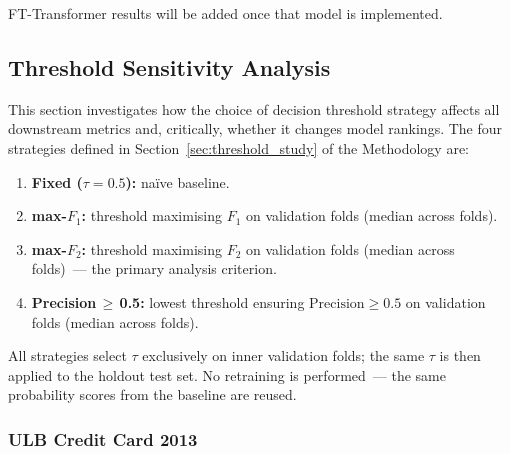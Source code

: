 FT-Transformer results will be added once that model is implemented.



\subsection{Threshold Sensitivity Analysis}
\label{sec:threshold_sensitivity}

This section investigates how the choice of decision threshold strategy
affects all downstream metrics and, critically, whether it changes model rankings.
The four strategies defined in Section~\ref{sec:threshold_study} of the Methodology are:
\begin{enumerate}
  \item \textbf{Fixed ($\tau=0.5$):} na\"ive baseline.
  \item \textbf{max-$F_1$:} threshold maximising $F_1$ on validation folds (median across folds).
  \item \textbf{max-$F_2$:} threshold maximising $F_2$ on validation folds (median across folds)~--- the primary analysis criterion.
  \item \textbf{Precision\,$\geq$\,0.5:} lowest threshold ensuring $\text{Precision} \geq 0.5$ on validation folds (median across folds).
\end{enumerate}

All strategies select $\tau$ exclusively on inner validation folds;
the same $\tau$ is then applied to the holdout test set.
No retraining is performed~--- the same probability scores from the baseline are reused.


\subsubsection{ULB Credit Card 2013}

